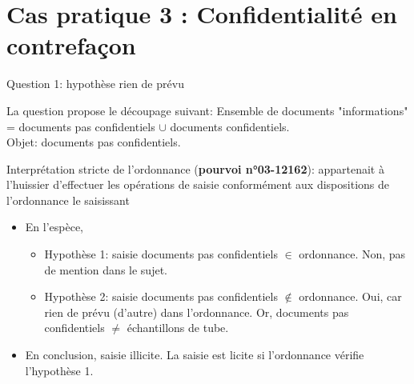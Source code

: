 
\section[Cas 3]{Cas pratique 3 : Confidentialité en
contrefaçon}

\begin{frame}{Question 1: hypothèse rien de prévu}

La question propose le découpage suivant: 
Ensemble de documents "informations" = documents pas confidentiels $\cup$
documents confidentiels.\\
Objet: documents pas confidentiels.

\begin{block}{}
Interprétation stricte de l'ordonnance (\textbf{pourvoi n°03-12162}):
appartenait à l'huissier d'effectuer les opérations de saisie 
conformément aux dispositions de l'ordonnance le saisissant
\end{block}

\begin{itemize}
    \item En l'espèce,
    \begin{itemize}
        \item Hypothèse 1: saisie documents pas confidentiels $\in$ ordonnance.
        Non, pas de mention dans le sujet.
        \item Hypothèse 2: saisie documents pas confidentiels $\notin$ ordonnance.
        Oui, car rien de prévu (d'autre) dans l'ordonnance.
        Or, documents pas confidentiels $\neq$ échantillons de tube.
    \end{itemize}
    \item En conclusion, saisie illicite. 
    La saisie est licite si l'ordonnance vérifie l'hypothèse 1.
\end{itemize}

\end{frame}

